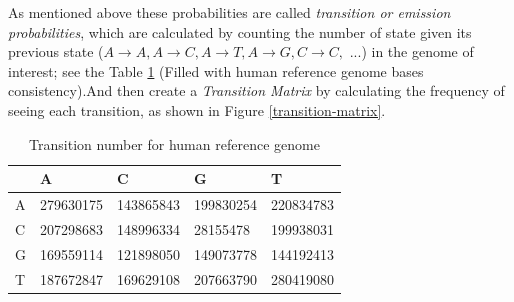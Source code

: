\documentclass[11pt,a4paper]{report}
\begin{document}



As mentioned above these probabilities are called \emph{transition or emission 
probabilities}, which are calculated by counting the number of state given its 
previous state ($ A \rightarrow A, A\rightarrow C, A \rightarrow T, A \rightarrow 
G, C \rightarrow C,$ ...) in the genome of interest; see the Table \ref{transition-table}
(Filled with human reference genome bases consistency).And then create a 
\emph{Transition Matrix} by calculating the frequency of seeing each transition,
as shown in Figure \ref{transition-matrix}.\\

\begin{table}[h]
  \begin{tabular}{ |  p{1cm} | p{2cm} | p{2cm} | p{2cm} | p{2cm} |}
    \hline
  	  
 	             & A   & C & G & T \\ \hline
      A  & 279630175  & 143865843 & 199830254 & 220834783 \\ \hline
 	  C	 & 207298683  & 148996334 & 28155478 & 199938031\\ \hline
 	  G	 & 169559114  & 121898050 & 149073778 & 144192413\\ \hline
 	  T  & 187672847  & 169629108  & 207663790 & 280419080\\ \hline
      
 	  
   \end{tabular}
  \caption{Transition number for human reference genome}
 \label{transition-table}
\end{table}
\end{document}
